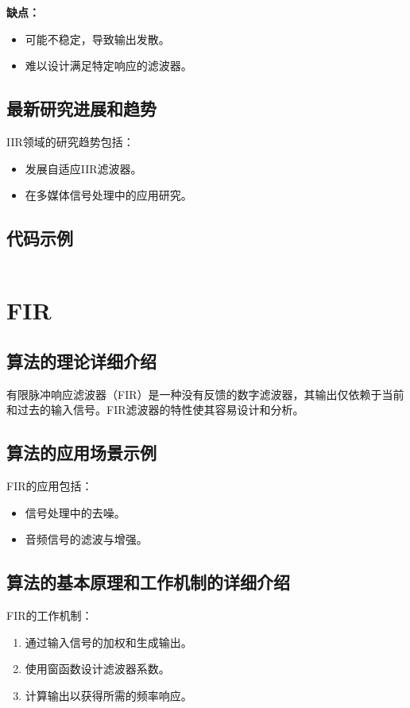 \textbf{缺点：}
\begin{itemize}
    \item 可能不稳定，导致输出发散。
    \item 难以设计满足特定响应的滤波器。
\end{itemize}

\subsection*{最新研究进展和趋势}
IIR领域的研究趋势包括：
\begin{itemize}
    \item 发展自适应IIR滤波器。
    \item 在多媒体信号处理中的应用研究。
\end{itemize}
\subsection*{代码示例}
\begin{lstlisting}

\end{lstlisting}


\section{FIR}
\subsection*{算法的理论详细介绍}
有限脉冲响应滤波器（FIR）是一种没有反馈的数字滤波器，其输出仅依赖于当前和过去的输入信号。FIR滤波器的特性使其容易设计和分析。

\subsection*{算法的应用场景示例}
FIR的应用包括：
\begin{itemize}
    \item 信号处理中的去噪。
    \item 音频信号的滤波与增强。
\end{itemize}

\subsection*{算法的基本原理和工作机制的详细介绍}
FIR的工作机制：
\begin{enumerate}
    \item 通过输入信号的加权和生成输出。
    \item 使用窗函数设计滤波器系数。
    \item 计算输出以获得所需的频率响应。
\end{enumerate}

